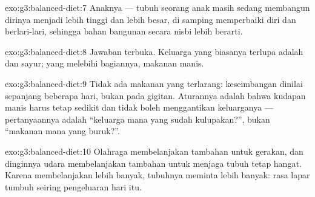 \begin{solution}{exo:g3:balanced-diet:7}
Anaknya --- tubuh seorang anak masih sedang membangun dirinya menjadi
lebih tinggi dan lebih besar, di samping memperbaiki diri dan
berlari-lari, sehingga bahan bangunan secara nisbi lebih berarti.
\end{solution}

\begin{solution}{exo:g3:balanced-diet:8}
Jawaban terbuka. Keluarga yang biasanya terlupa adalah  dan sayur;
yang melebihi bagiannya, makanan manis.
\end{solution}

\begin{solution}{exo:g3:balanced-diet:9}
Tidak ada makanan yang terlarang: keseimbangan dinilai sepanjang
beberapa hari, bukan pada gigitan. Aturannya adalah bahwa kudapan
manis harus tetap sedikit dan tidak boleh menggantikan keluarganya ---
pertanyaannya adalah ``keluarga mana yang sudah kulupakan?'', bukan
``makanan mana yang buruk?''.
\end{solution}

\begin{solution}{exo:g3:balanced-diet:10}
Olahraga membelanjakan  tambahan untuk gerakan, dan dinginnya
udara membelanjakan  tambahan untuk menjaga tubuh tetap hangat.
Karena membelanjakan lebih banyak, tubuhnya meminta lebih banyak: rasa
lapar tumbuh seiring pengeluaran hari itu.
\end{solution}
